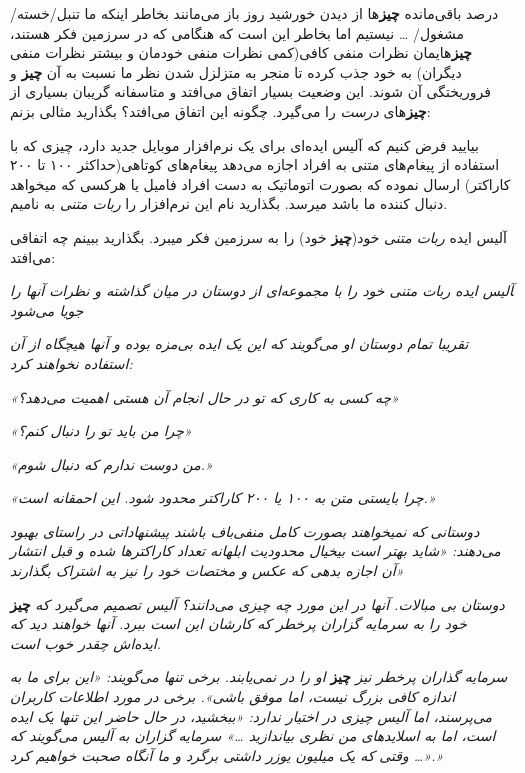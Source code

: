 درصد باقی‌مانده \textbf{چیز}ها از دیدن خورشید روز باز می‌مانند بخاطر
اینکه ما تنبل/خسته/مشغول/ \ldots{} نیستیم اما بخاطر این است که هنگامی که
در سرزمین فکر هستند، \textbf{چیز}هایمان نظرات منفی کافی(کمی نظرات منفی
خودمان و بیشتر نظرات منفی دیگران) به خود جذب کرده تا منجر به متزلزل شدن
نظر ما نسبت به آن \textbf{چیز} و فروریختگی آن شوند. این وضعیت بسیار
اتفاق می‌افتد و متاسفانه گریبان بسیاری از \textbf{چیز}های \emph{درست} را
می‌گیرد. چگونه این اتفاق می‌افتد؟ بگذارید مثالی بزنم:

بیایید فرض کنیم که آلیس ایده‌ای برای یک نرم‌افزار موبایل جدید دارد، چیزی
که با استفاده از پیغام‌های متنی به افراد اجازه می‌دهد پیغام‌های
کوتاهی(حداکثر ۱۰۰ تا ۲۰۰ کاراکتر) ارسال نموده که بصورت اتوماتیک به دست
افراد فامیل یا هرکسی که میخواهد دنبال کننده ما باشد میرسد. بگذارید نام
این نرم‌افزار را \emph{ربات متنی} به نامیم.

آلیس ایده \emph{ربات متنی} خود(\textbf{چیز} خود) را به سرزمین فکر‌
میبرد. بگذارید ببینم چه اتفاقی می‌افتد:

‍\emph{آلیس ایده ربات متنی خود را با مجموعه‌ای از دوستان در میان گذاشته
و نظرات آنها را جویا می‌شود}

\emph{تقریبا تمام دوستان او می‌گویند که این یک ایده بی‌مزه بوده و آنها
هیچگاه از آن استفاده نخواهند کرد:}

\emph{«چه کسی به کاری که تو در حال انجام آن هستی اهمیت می‌دهد؟»}

\emph{«چرا من باید تو را دنبال کنم؟»}

\emph{«من دوست ندارم که دنبال شوم.»}

\emph{«چرا بایستی متن به ۱۰۰ یا ۲۰۰ کاراکتر محدود شود. این احمقانه
است.»}

\emph{دوستانی که نمیخواهند بصورت کامل منفی‌باف باشند پیشنهاداتی در
راستای بهبود می‌دهند: «شاید بهتر است بیخیال محدودیت ابلهانه تعداد
کاراکترها شده و قبل انتشار آن اجازه بدهی که عکس و مختصات خود را نیز به
اشتراک بگذارند»}

\emph{دوستان بی مبالات. آنها در این مورد چه چیزی می‌دانند؟ آلیس تصمیم
می‌گیرد که} \textbf{چیز} \emph{خود را به سرمایه گزاران پرخطر که کارشان
این است ببرد. آنها خواهند دید که ایده‌اش چقدر خوب است.}

\emph{سرمایه گذاران پرخطر نیز} \textbf{چیز} \emph{او را در نمی‌یابند.
برخی تنها می‌گویند: «این برای ما به اندازه کافی بزرگ نیست، اما موفق
باشی». برخی در مورد اطلاعات کاربران می‌پرسند، اما آلیس چیزی در اختیار
ندارد: «ببخشید، در حال حاضر این تنها یک ایده‌ است، اما به اسلایدهای من
نظری بیاندازید \ldots{}» سرمایه گزاران به آلیس می‌گویند که «\ldots{}
وقتی که یک میلیون یوزر داشتی برگرد و ما آنگاه صحبت خواهیم کرد.»}

